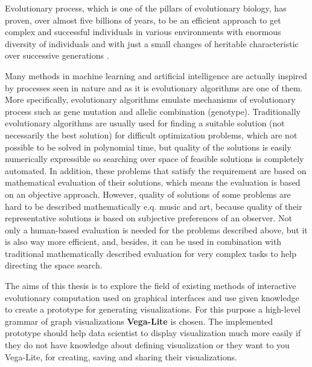 \label{Introduction}
Evolutionary process, which is one of the pillars of evolutionary biology, has proven, over almost five billions of years, to be an efficient approach to get complex and successful individuals in various environments with enormous diversity of individuals and with just a small changes of heritable characteristic over successive generations \cite{on-the-origin-of-species}.

Many methods in machine learning and artificial intelligence are actually inspired by processes seen in nature \cite{introduction-to-evolutionary-computing} and as it is evolutionary algorithms are one of them. More specifically, evolutionary algorithms emulate mechanisms of evolutionary process such as gene mutation and allelic combination (genotype). Traditionally evolutionary algorithms are usually used for finding a suitable solution (not necessarily the best solution) for difficult optimization problems, which are not possible to be solved in polynomial time, but quality of the solutions is easily numerically expressible so searching over space of feasible solutions is completely automated. In addition, these problems that satisfy the requirement are based on mathematical evaluation of their solutions, which means the evaluation is based on an objective approach. However, quality of solutions of some problems are hard to be described mathematically e.q. music and art, because quality of their representative solutions is based on subjective preferences of an observer. Not only a human-based evaluation is needed for the problems described above, but it is also way more efficient, and, besides, it can be used in combination with traditional mathematically described evaluation for very complex tasks to help directing the space search.

The aims of this thesis is to explore the field of existing methods of interactive evolutionary computation used on graphical interfaces and use given knowledge to create a prototype for generating visualizations. For this purpose a high-level grammar of graph visualizations \textbf{Vega-Lite} \cite{vega} is chosen. The implemented prototype should help data scientist to display visualization much more easily if they do not have knowledge about defining visualization or they want to you Vega-Lite, for creating, saving and sharing their visualizations.
